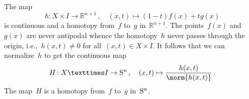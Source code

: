 \subsection{}

The map
\[
	h
	\colon
	X × I \to ℝ^{n + 1} \,,
	\quad
	(x, t) \mapsto (1 - t) f(x) + t g(x)
\]
is continuous and a homotopy from~$f$ to~$g$ in~$ℝ^{n + 1}$.
The points~$f(x)$ and~$g(x)$ are never antipodal whence the homotopy~$h$ never passes through the origin, i.e.,~$h(x, t) ≠ 0$ for all~$(x, t) ∈ X × I$.
It follows that we can normalize~$h$ to get the continuous map
\[
	H
	\colon
	X × I \to \sphere^n \,,
	\quad
	(x, t) \mapsto \frac{h(x, t)}{\norm{h(x, t)}} \,.
\]
The map~$H$ is a homotopy from~$f$ to~$g$ in~$\mathrm{S}^n$.
